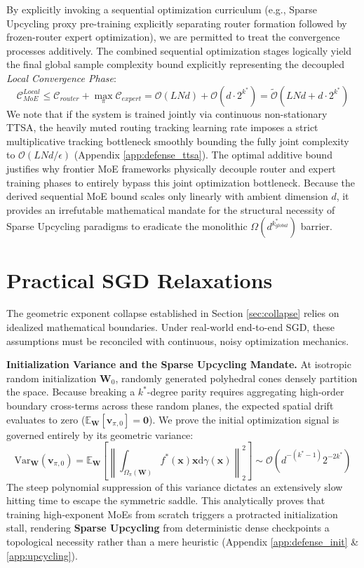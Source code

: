 \documentclass{article}
\newcommand{\E}{\mathbb{E}}
\newcommand{\1}{\mathbb{I}}
\newcommand{\diff}{\mathrm{d}}
\newcommand{\norm}[1]{\left\lVert#1\right\rVert}
\newcommand{\calO}{\mathcal{O}}
\newcommand{\bx}{\mathbf{x}}
\newcommand{\bv}{\mathbf{v}}
\newcommand{\bW}{\mathbf{W}}
\newcommand{\Var}{\mathrm{Var}}
\begin{document}
By explicitly invoking a sequential optimization curriculum (e.g., Sparse Upcycling proxy pre-training explicitly separating router formation followed by frozen-router expert optimization), we are permitted to treat the convergence processes additively. The combined sequential optimization stages logically yield the final global sample complexity bound explicitly representing the decoupled \textit{Local Convergence Phase}:
\begin{equation}
    \mathcal{C}_{MoE}^{Local} \le \mathcal{C}_{router} + \max_\pi \mathcal{C}_{expert} = \calO(LNd) + \calO(d \cdot 2^{k^*}) = \tilde{\calO}\left(LNd + d \cdot 2^{k^*}\right)
\end{equation}
We note that if the system is trained jointly via continuous non-stationary TTSA, the heavily muted routing tracking learning rate imposes a strict multiplicative tracking bottleneck smoothly bounding the fully joint complexity to $\calO(L N d / \epsilon)$ (Appendix \ref{app:defense_ttsa}). The optimal additive bound justifies why frontier MoE frameworks physically decouple router and expert training phases to entirely bypass this joint optimization bottleneck. Because the derived sequential MoE bound scales only linearly with ambient dimension $d$, it provides an irrefutable mathematical mandate for the structural necessity of Sparse Upcycling paradigms to eradicate the monolithic $\Omega(d^{k_{global}^*})$ barrier.

\section{Practical SGD Relaxations}
\label{sec:relaxations}

The geometric exponent collapse established in Section \ref{sec:collapse} relies on idealized mathematical boundaries. Under real-world end-to-end SGD, these assumptions must be reconciled with continuous, noisy optimization mechanics.

\textbf{Initialization Variance and the Sparse Upcycling Mandate.} At isotropic random initialization $\bW_0$, randomly generated polyhedral cones densely partition the space. Because breaking a $k^*$-degree parity requires aggregating high-order boundary cross-terms across these random planes, the expected spatial drift evaluates to zero ($\E_\bW[\bv_{\pi, 0}] = \mathbf{0}$). We prove the initial optimization signal is governed entirely by its geometric variance:
\begin{equation}
    \Var_\bW(\bv_{\pi, 0}) = \E_\bW \left[ \norm{ \int_{\Omega_\pi(\bW)} f^*(\bx) \bx \diff\gamma(\bx) }_2^2 \right] \sim \calO\left( d^{-(k^*-1)} 2^{-2k^*} \right)
\end{equation}
The steep polynomial suppression of this variance dictates an extensively slow hitting time to escape the symmetric saddle. This analytically proves that training high-exponent MoEs from scratch triggers a protracted initialization stall, rendering \textbf{Sparse Upcycling} \citep{komatsuzaki2023sparse} from deterministic dense checkpoints a topological necessity rather than a mere heuristic (Appendix \ref{app:defense_init} \& \ref{app:upcycling}).
\end{document}
